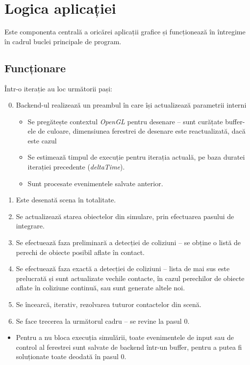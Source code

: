 \documentclass[12pt,a4paper]{report}
\begin{document}
\section{Logica aplicației}

Este componenta centrală a oricărei aplicații grafice și funcționează în întregime în cadrul buclei principale de program.

\subsection{Funcționare}
Într-o iterație au loc următorii pași:
\begin{enumerate}
	\setcounter{enumi}{-1}
	\item Backend-ul realizează un preambul în care își actualizează parametrii interni
	\begin{itemize}
		\item Se pregătește contextul \textit{OpenGL} pentru desenare -- sunt curățate buffer-ele de culoare, dimensiunea ferestrei de desenare este reactualizată, dacă este cazul
		\item Se estimează timpul de execuție pentru iterația actuală, pe baza duratei iterației precedente (\textit{deltaTime}).
		\item Sunt procesate evenimentele salvate anterior.
	\end{itemize}
	\item Este desenată scena în totalitate.
	\item Se actualizează starea obiectelor din simulare, prin efectuarea pasului de integrare.
	\item Se efectuează faza preliminară a detecției de coliziuni -- se obține o listă de perechi de obiecte posibil aflate în contact.
	\item Se efectuează faza exactă a detecției de coliziuni -- lista de mai sus este prelucrată și sunt actualizate vechile contacte, în cazul perechilor de obiecte aflate în coliziune continuă, sau sunt generate altele noi.
	\item Se încearcă, iterativ, rezolvarea tuturor contactelor din scenă.
	\item Se face trecerea la următorul cadru -- se revine la pasul 0.
\end{enumerate}
\begin{itemize}
	\item Pentru a nu bloca execuția simulării, toate evenimentele de input sau de control al ferestrei sunt salvate de backend într-un buffer, pentru a putea fi soluționate toate deodată în pasul 0.
\end{itemize}
\end{document}
